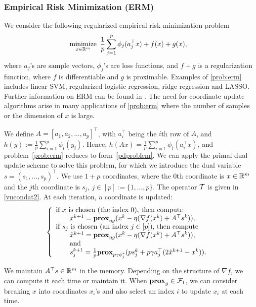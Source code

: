 \subsubsection{Empirical Risk Minimization (ERM)}
We consider the following regularized empirical risk minimization problem
\begin{equation}\label{prob:erm}
\Min_{x\in\RR^m}~ \frac{1}{p}\sum_{j=1}^p\phi_j(a_j^\top x)+f(x)+g(x),
\end{equation}
where $a_j$'s are sample vectors, $\phi_j$'s are loss functions, and $f+g$ is a regularization function, where $f$ is differentiable and $g$ is proximable. Examples of \eqref{prob:erm} includes linear SVM, regularized logistic regression, ridge regression and LASSO. Further information on ERM can be found in \cite{hastie2005elements}. The need for coordinate update algorithms arise in many applications of \eqref{prob:erm} where the number of samples or the dimension of $x$ is large. 

We define $A=[a_1,a_2,...,a_p]^\top$, with $a_i^{\top}$ being the $i$th row of $A$, and $h(y):=\frac{1}{p}\sum_{i=1}^p\phi_i(y_i)$. Hence, $h(Ax)=\frac{1}{p}\sum_{i=1}^p\phi_i(a_i^\top x)$, and problem~\eqref{prob:erm} reduces to form~\eqref{pdproblem}.
We can apply the primal-dual update scheme to solve this problem, for which we introduce the dual variable $s = (s_1, ..., s_p)^\top$. We use $1+p$ coordinates, where the $0$th coordinate is $x\in\mathbb{R}^m$ and the $j$th coordinate is $s_j$, $j\in [p] := \{1,\ldots,p\}$. The operator ${\mathcal{T}}$ is given in \eqref{vucondat2}. At each iteration, a coordinate is updated:
\begin{equation}
{\left\{
\begin{array}{l}
\text{if }x\text{ is chosen (the index 0), then compute}\\
\qquad {x}^{k+1}=\prox_{\eta g}(x^k-\eta(\nabla f(x^k)+A^\top s^k)),\\
\text{if }s_j\text{ is chosen (an index $j \in [p]$), then compute}\\
\qquad\tilde{x}^{k+1}=\prox_{\eta g}(x^k-\eta(\nabla f(x^k)+A^\top s^k)),\\
\qquad\text{and}\\
\qquad{s}_j^{k+1}=\frac{1}{p}\prox_{p\gamma \phi_j^*} (ps_j^k+p\gamma a_j^\top(2\tilde{x}^{k+1}-x^k)).
\end{array}
\right.
}\end{equation}

We maintain $A^\top s\in \mathbb{R}^m$ in the memory. Depending on the structure of $\nabla f$, we can compute it each time or maintain it. When $\mathbf{prox}_g\in{\mathcal{F}}_1$, we can consider breaking $x$ into coordinates $x_i$'s and also select an index $i$ to update $x_i$ at each time.
